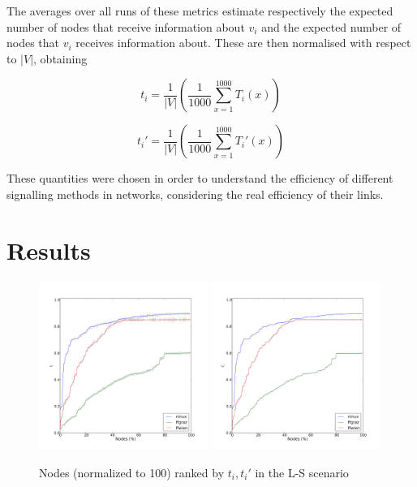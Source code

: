 \documentclass[a4paper,11pt,twoside,openright]{memoir}
\begin{document}
The averages over all runs of these metrics estimate respectively the
expected number of nodes that receive information about $v_i$ and the
expected number of nodes that $v_i$ receives information about. These
are then normalised with respect to $|V|$, obtaining

\begin{equation}
t_i = \frac{1}{|V|}
      \left( \frac{1}{1000} \sum_{x=1}^{1000} T_i(x) \right)
\end{equation}

\begin{equation}
t_i' = \frac{1}{|V|}
       \left( \frac{1}{1000} \sum_{x=1}^{1000} T_i'(x) \right)
\end{equation}

These quantities were chosen in order to understand the efficiency of
different signalling methods in networks, considering the real
efficiency of their links.

\section{Results}\label{signalling-results}

\begin{figure}[htb]
  \centering
  \hspace*{\fill}
  \includegraphics[width=0.49\textwidth]{graphs/all-batman-Tc}
  \hfill
  \includegraphics[width=0.49\textwidth]{graphs/all-batman-Rc}
  \hspace*{\fill}
  \caption{Nodes (normalized to 100) ranked by $t_i, t_i'$ in the L-S scenario}
  \label{fig:mp_ls}
\end{figure}
\end{document}
